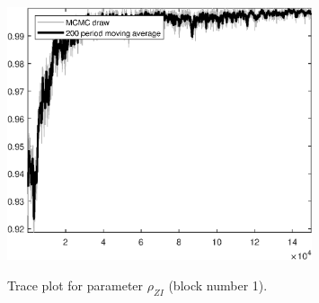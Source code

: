 \begin{figure}[H]
\centering
  \includegraphics[width=0.8\textwidth]{BRS_sectoral_wo_gmf/graphs/TracePlot_rho_ZI_blck_1}\\
    \caption{Trace plot for parameter ${\rho_{ZI}}$ (block number 1).}
\end{figure}
